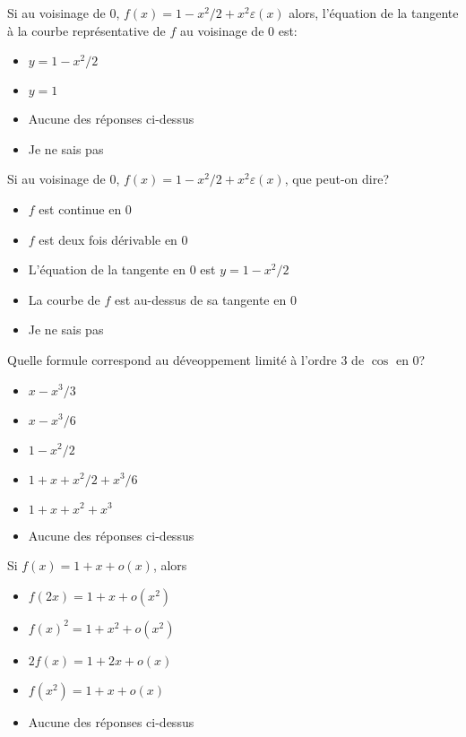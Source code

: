 \begin{clickers}
    Si au voisinage de \(0\), \(f(x)=1-x^2/2+x^2\varepsilon(x)\) alors, l'équation de la tangente à la courbe représentative de \(f\) au voisinage de \(0\) est:
    \begin{itemize}
        \item \(y=1-x^2/2\)
        \item \(y=1\)
        \item Aucune des réponses ci-dessus
        \item Je ne sais pas
    \end{itemize}
\end{clickers}

\begin{clickers}
    Si au voisinage de \(0\), \(f(x)=1-x^2/2+x^2\varepsilon(x)\), que peut-on dire?
    \begin{itemize}
        \item \(f\) est continue en \(0\)
        \item \(f\) est deux fois dérivable en \(0\)
        \item L'équation de la tangente en \(0\) est \(y=1-x^2/2\)
        \item La courbe de \(f\) est au-dessus de sa tangente en \(0\)
        \item Je ne sais pas
    \end{itemize}
\end{clickers}


\begin{clickers}
    Quelle formule correspond au déveoppement limité à l'ordre \(3\) de \(\cos\) en \(0\)?
    \begin{itemize}
        \item \(x-x^3/3\)
        \item \(x-x^3/6\)
        \item \(1-x^2/2\)
        \item \(1+x+x^2/2+x^3/6\)
        \item \(1+x+x^2+x^3\)
        \item Aucune des réponses ci-dessus
    \end{itemize}
\end{clickers}


\begin{clickers}
    Si \(f(x)=1+x+o(x)\), alors
    \begin{itemize}
        \item \(f(2x) = 1+x+o(x^2)\)
        \item \(f(x)^2 = 1 + x^2+o(x^2)\)
        \item \(2f(x) = 1+2x+o(x)\)
        \item \(f(x^2) = 1+x+o(x)\)
        \item Aucune des réponses ci-dessus
    \end{itemize}
\end{clickers}


